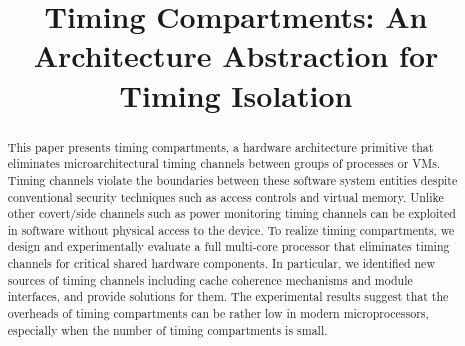 \title{
    Timing Compartments: An Architecture Abstraction for Timing Isolation
}



\date{}
\maketitle

\thispagestyle{empty}

\begin{abstract}
    This paper presents timing compartments, a hardware architecture primitive 
    that eliminates microarchitectural timing channels between groups of 
    processes or VMs. Timing channels violate the boundaries between these 
    software system entities despite conventional security techniques such as 
    access controls and virtual memory. Unlike other covert/side channels such 
    as power monitoring timing channels can be exploited in software without 
    physical access to the device. 
    To realize timing 
    compartments, we design and experimentally evaluate a full multi-core 
    processor that eliminates timing channels for critical shared hardware 
    components. 
    In particular, we identified new sources of timing channels including
    cache coherence mechanisms and module interfaces, and provide solutions for them.
    The experimental results suggest that the overheads of
    timing compartments can be rather low in modern microprocessors, especially 
    when the number of timing compartments is small.

\end{abstract}
